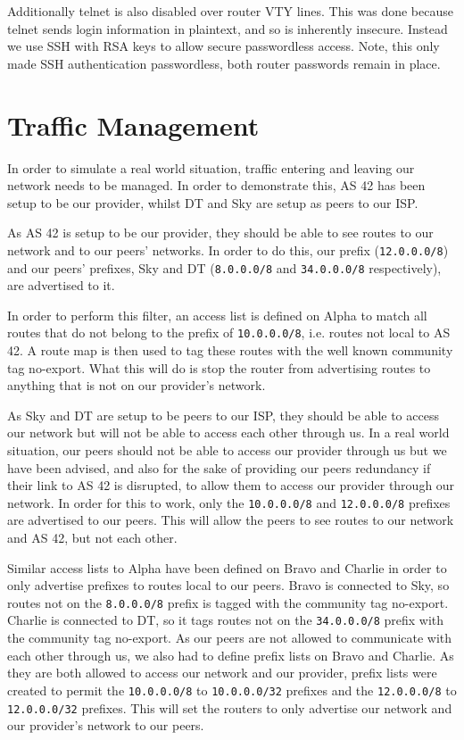 Additionally telnet is also disabled over router VTY lines. This was done
because telnet sends login information in plaintext, and so is inherently
insecure. Instead we use SSH with RSA keys to allow secure passwordless access.
Note, this only made SSH authentication passwordless, both router passwords
remain in place.

\section{Traffic Management}
In order to simulate a real world situation, traffic entering and leaving our
network needs to be managed. In order to demonstrate this, AS 42 has been setup
to be our provider, whilst DT and Sky are setup as peers to our ISP.

As AS 42 is
setup to be our provider, they should be able to see routes to our network
and to our peers' networks. In order to do this, our prefix (\texttt
{12.0.0.0/8}) and our peers'
prefixes, Sky and DT (\texttt{8.0.0.0/8} and \texttt{34.0.0.0/8} respectively),
are advertised to it.

In order to perform this filter, an access list is defined on Alpha to
match all routes that do not belong to the prefix of \texttt{10.0.0.0/8}, i.e.
routes not local to AS 42. A route map is then used to tag these routes with the
well known community tag no-export. What this will do is stop the router from
advertising routes to anything that is not on our provider's network.

As Sky and DT are setup to be peers to our ISP, they
should be able to access our network but will not be able to access each other
through us. In a real world situation, our peers should not be able to access
our provider through us but we have been advised, and also for the sake of
providing our peers redundancy if their link to AS 42 is disrupted, to allow
them to access our provider through our network. In order for this to work,
only the \texttt{10.0.0.0/8} and \texttt{12.0.0.0/8} prefixes are advertised to
our peers. This will allow the peers to see routes to our network and AS
42, but not each other.


Similar access lists to Alpha have been defined on Bravo and Charlie in order to
only advertise prefixes to routes local to our peers. Bravo is connected to Sky,
so routes not on the \texttt{8.0.0.0/8} prefix is tagged with the community tag
no-export. Charlie is connected to DT, so it tags routes not on the
\texttt{34.0.0.0/8} prefix with the community tag no-export. As our peers are
not allowed to communicate with each other through us, we also had to define
prefix lists on Bravo and Charlie. As they are both allowed to access our
network and our provider, prefix lists were created to permit the
\texttt{10.0.0.0/8} to \texttt{10.0.0.0/32} prefixes and the \texttt{12.0.0.0/8}
to \texttt{12.0.0.0/32} prefixes. This will set the routers to only advertise
our network and our provider's network to our peers.

